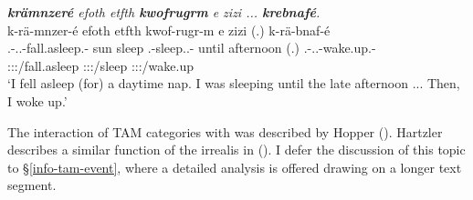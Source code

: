 \begin{exe}
	\ex \emph{\textbf{krämnzeré} efoth etfth \textbf{kwofrugrm} e zizi ... \textbf{krebnafé}.}\\
	\glll k-rä-mnzer-é efoth etfth kwof-rugr-m e zizi (.) k-rä-bnaf-é\\
	\M.\Bet-\Irr.\Vc.\Ndu-fall.asleep.\Rs-\Fsg{} sun sleep \Fsg.\Betatwo-sleep.\Ext.\Ndu-\Dur{} until afternoon (.) \M.\Bet-\Irr.\Vc.\Ndu-wake.up.\Rs-\Fsg{}\\
	\footnotesize{\Fsg:\Sbj:\Irr:\Pfv/fall.asleep} {} {} \footnotesize{\Fsg:\Sbj:\Pst:\Dur/sleep} {} {} {} \footnotesize{\Fsg:\Sbj:\Irr:\Pfv/wake.up}\\
	\trans `I fell asleep (for) a daytime nap. I was sleeping until the late afternoon ... Then, I woke up.' 
	\label{ex377}
\end{exe}

The interaction of TAM categories with  was described by Hopper (\citeyear{Hopper:1979us}). Hartzler describes a similar function of the irrealis  in  (\citeyear{Hartzler:1983wm}). I defer the discussion of this topic to \S{}\ref{info-tam-event}, where a detailed analysis is offered drawing on a longer text segment.